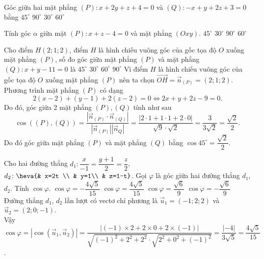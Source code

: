 \begin{ex}
	Góc giữa hai mặt phẳng $(P):x+2y+z+4=0$ và $(Q):-x+y+2z+3=0$ bằng
	\choice
	{$45^{\circ}$}
	{$90^{\circ}$}
	{$30^{\circ}$}
	{\True $60^{\circ}$}
\end{ex}

\begin{ex}
	Tính góc $\alpha$ giữa mặt $(P)\colon x+z-4=0$ và mặt phẳng $(Oxy)$.
	\choice
	{\True $45^\circ$}
	{$30^\circ$}
	{$90^\circ$}
	{$60^\circ$}
\end{ex}

\begin{ex}
	Cho điểm $H\left(2;1;2 \right)$, điểm $H$ là hình chiếu vuông góc của gốc tọa độ $O$ xuống mặt phẳng $\left(P \right)$, số đo góc giữa mặt phẳng $\left(P \right)$ và mặt phẳng $\left(Q \right):x+y-11=0$ là
	\choice
	{\True $45^\circ$}
	{$30^\circ$}
	{$60^\circ$}
	{$90^\circ$}
	\loigiai
	{
		Vì điểm $H$ là hình chiếu vuông góc của gốc tọa độ $O$ xuống mặt phẳng $(P)$ nên ta chọn
		$\vec{OH}=\vec{n}_{(P)}=(2;1;2)$.\\
		Phương trình mặt phẳng $(P)$ có dạng
		$$2\left(x-2\right)+\left(y-1\right)+2\left(z-2\right)=0\Leftrightarrow 2x+y+2z-9=0.$$
		Do đó, góc giữa 2 mặt phẳng $(P),(Q)$ tính như sau
		$$\cos \left((P),(Q)\right)=\dfrac{\left|{\vec{n}_{(P)}\cdot\vec{n}_{(Q)}}\right|}{\left|{\vec{n}_{(P)}}\right|\left|{\vec{n}_Q}\right|}=\dfrac{|2\cdot1+1\cdot1+2\cdot0|}{\sqrt{9}\cdot\sqrt{2}}=\dfrac{3}{3\sqrt{2}}=\dfrac{\sqrt{2}}{2}.$$
		Do đó góc giữa mặt phẳng $(P)$ và mặt phẳng $(Q)$ bằng $\cos 45^\circ=\dfrac{\sqrt{2}}{2}$.
	}
\end{ex}


\begin{ex}
	Cho hai đường thẳng $d_1\colon \dfrac{x}{-1}=\dfrac{y+1}{2}=\dfrac{z}{2}$, $d_2\colon\heva{& x=2t \\ & y=1\\ & z=1-t}$. Gọi $\varphi$ là góc
	giữa hai đường thẳng $d_1$, $d_2$. Tính $\cos\varphi$.
	\choice
	{$\cos \varphi=-\dfrac{4\sqrt{5}}{15}$}
	{\True $\cos \varphi=\dfrac{4\sqrt{5}}{15}$}
	{$\cos \varphi=\dfrac{\sqrt{6}}{9}$}
	{$\cos \varphi=-\dfrac{\sqrt{6}}{9}$}
	\loigiai
	{Đường thẳng $d_1$, $d_2$ lần lượt có vectơ chỉ phương là $\overrightarrow{u}_1=(-1; 2; 2)$ và $\overrightarrow{u}_2=(2; 0; -1)$.\\
		Vậy $\cos\varphi=\left|\cos\left(\overrightarrow{u}_1, \overrightarrow{u}_2\right)\right|=\dfrac{|(-1)\times 2 +2\times 0+ 2\times(-1)|}{\sqrt{(-1)^2+2^2+2^2}\cdot\sqrt{2^2+0^2+(-1)^2}}=\dfrac{|-4|}{3\sqrt{5}}=\dfrac{4\sqrt{5}}{15}$.
	}
\end{ex}

